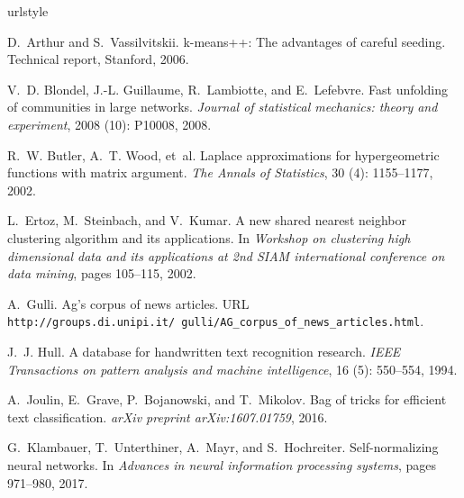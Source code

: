 \documentclass{article}
\begin{document}
\begin{thebibliography}{30}
\providecommand{\natexlab}[1]{#1}
\providecommand{\url}[1]{\texttt{#1}}
\expandafter\ifx\csname urlstyle\endcsname\relax
  \providecommand{\doi}[1]{doi: #1}\else
  \providecommand{\doi}{doi: \begingroup \urlstyle{rm}\Url}\fi

D.~Arthur and S.~Vassilvitskii.
\newblock k-means++: The advantages of careful seeding.
\newblock Technical report, Stanford, 2006.

V.~D. Blondel, J.-L. Guillaume, R.~Lambiotte, and E.~Lefebvre.
\newblock Fast unfolding of communities in large networks.
\newblock \emph{Journal of statistical mechanics: theory and experiment},
  2008 (10): P10008, 2008.

R.~W. Butler, A.~T. Wood, et~al.
\newblock Laplace approximations for hypergeometric functions with matrix
  argument.
\newblock \emph{The Annals of Statistics}, 30 (4):
  1155--1177, 2002.

L.~Ertoz, M.~Steinbach, and V.~Kumar.
\newblock A new shared nearest neighbor clustering algorithm and its
  applications.
\newblock In \emph{Workshop on clustering high dimensional data and its
  applications at 2nd SIAM international conference on data mining}, pages
  105--115, 2002.

A.~Gulli.
\newblock Ag's corpus of news articles.
\newblock URL
  \url{http://groups.di.unipi.it/~gulli/AG_corpus_of_news_articles.html}.

J.~J. Hull.
\newblock A database for handwritten text recognition research.
\newblock \emph{IEEE Transactions on pattern analysis and machine
  intelligence}, 16 (5): 550--554, 1994.

A.~Joulin, E.~Grave, P.~Bojanowski, and T.~Mikolov.
\newblock Bag of tricks for efficient text classification.
\newblock \emph{arXiv preprint arXiv:1607.01759}, 2016.

G.~Klambauer, T.~Unterthiner, A.~Mayr, and S.~Hochreiter.
\newblock Self-normalizing neural networks.
\newblock In \emph{Advances in neural information processing systems}, pages
  971--980, 2017.


\end{thebibliography}
\end{document}
